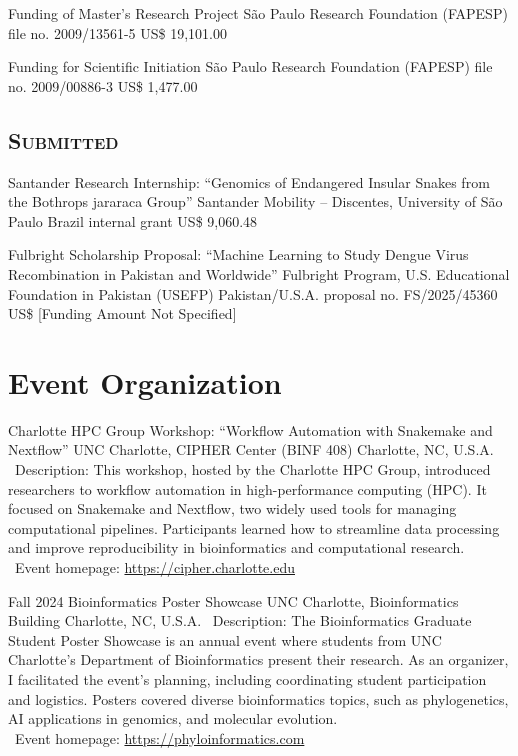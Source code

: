 \documentclass[11pt, letterpaper, sans]{moderncv}
\begin{document}
{Funding of Master's Research Project}
{São Paulo Research Foundation (FAPESP)}
{file no. 2009/13561-5}
{US\$ 19,101.00}{}

{Funding for Scientific Initiation}
{São Paulo Research Foundation (FAPESP)}
{file no. 2009/00886-3}
{US\$ 1,477.00}{}

\vspace{.5em}
	\subsection{\textsc{Submitted}}
\vspace{.5em}

{Santander Research Internship: ``Genomics of Endangered Insular Snakes from the Bothrops jararaca Group''}
{Santander Mobility – Discentes, University of São Paulo}
{Brazil}
{internal grant}
{US\$ 9,060.48}{}

{Fulbright Scholarship Proposal: ``Machine Learning to Study Dengue Virus Recombination in Pakistan and Worldwide''}
{Fulbright Program, U.S. Educational Foundation in Pakistan (USEFP)}
{Pakistan/U.S.A.}
{proposal no. FS/2025/45360}
{US\$ [Funding Amount Not Specified]}{}



\section{Event Organization}

    {Charlotte HPC Group Workshop: ``Workflow Automation with Snakemake and Nextflow''}
    {UNC Charlotte, CIPHER Center (BINF 408)}
    {Charlotte, NC, U.S.A.}
    {}
    {
        \textbullet~Description: This workshop, hosted by the Charlotte HPC Group, introduced researchers to workflow automation in high-performance computing (HPC). It focused on Snakemake and Nextflow, two widely used tools for managing computational pipelines. Participants learned how to streamline data processing and improve reproducibility in bioinformatics and computational research.\\
        \textbullet~Event homepage: \url{https://cipher.charlotte.edu}
    }

    {Fall 2024 Bioinformatics Poster Showcase}
    {UNC Charlotte, Bioinformatics Building}
    {Charlotte, NC, U.S.A.}
    {}
    {
        \textbullet~Description: The Bioinformatics Graduate Student Poster Showcase is an annual event where students from UNC Charlotte's Department of Bioinformatics present their research. As an organizer, I facilitated the event’s planning, including coordinating student participation and logistics. Posters covered diverse bioinformatics topics, such as phylogenetics, AI applications in genomics, and molecular evolution.\\
        \textbullet~Event homepage: \url{https://phyloinformatics.com}
    }
\end{document}
